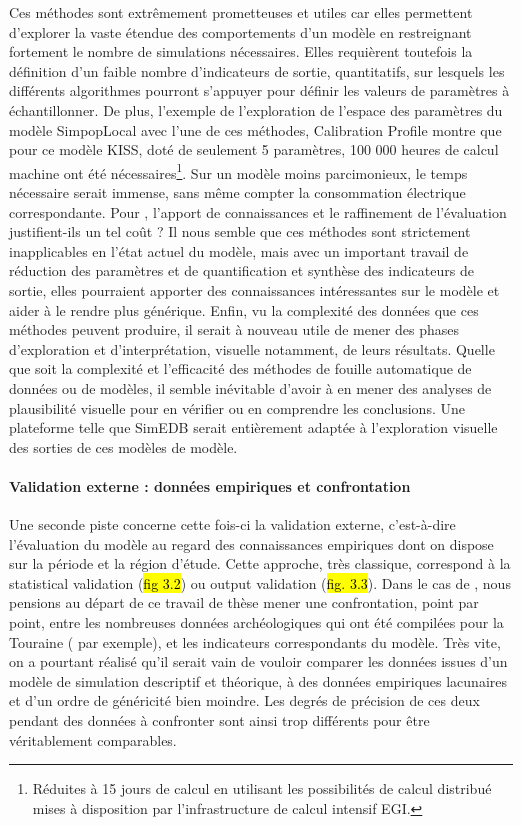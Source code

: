 \noindent Ces méthodes sont extrêmement prometteuses et utiles car elles permettent d'explorer la vaste étendue des comportements d'un modèle en restreignant fortement le nombre de simulations nécessaires.
Elles requièrent toutefois la définition d'un faible nombre d'indicateurs de sortie, quantitatifs, sur lesquels les différents algorithmes pourront s'appuyer pour définir les valeurs de paramètres à échantillonner.
De plus, l'exemple de l'exploration de l'espace des paramètres du modèle SimpopLocal \autocite{schmitt_modelisation_2014} avec l'une de ces méthodes, \og Calibration Profile\fg{} \autocite{reuillon_new_2015} montre que pour ce modèle KISS, doté de seulement 5 paramètres, 100 000 heures de calcul machine ont été nécessaires\footnote{
	Réduites à 15 jours de calcul en utilisant les possibilités de calcul distribué mises à disposition par l'infrastructure de calcul intensif EGI.
}.
Sur un modèle moins parcimonieux, le temps nécessaire serait immense, sans même compter la consommation électrique correspondante.
Pour \simfeodal{}, l'apport de connaissances et le raffinement de l'évaluation justifient-ils un tel coût ?
Il nous semble que ces méthodes sont strictement inapplicables en l'état actuel du modèle, mais avec un important travail de réduction des paramètres et de quantification et synthèse des indicateurs de sortie, elles pourraient apporter des connaissances intéressantes sur le modèle et aider à le rendre plus générique.
Enfin, vu la complexité des données que ces méthodes peuvent produire, il serait à nouveau utile de mener des phases d'exploration et d'interprétation, visuelle notamment, de leurs résultats.
Quelle que soit la complexité et l'efficacité des méthodes de fouille automatique de données ou de modèles, il semble inévitable d'avoir à en mener des analyses de plausibilité visuelle pour en vérifier ou en comprendre les conclusions.
Une plateforme telle que SimEDB serait entièrement adaptée à l'exploration visuelle des sorties de ces modèles de modèle.

\paragraph{Validation externe : données empiriques et confrontation}
Une seconde piste concerne cette fois-ci la validation externe, c'est-à-dire l'évaluation du modèle au regard des connaissances empiriques dont on dispose sur la période et la région d'étude.
Cette approche, très classique, correspond à la \og statistical validation\fg{} (\hl{fig 3.2}) ou \og output validation\fg{} (\hl{fig. 3.3}).
Dans le cas de \simfeodal{}, nous pensions au départ de ce travail de thèse mener une confrontation, point par point, entre les nombreuses données archéologiques qui ont été compilées pour la Touraine (\textcite{rodier_modelisation_2010} par exemple), et les indicateurs correspondants du modèle.
Très vite, on a pourtant réalisé qu'il serait vain de vouloir comparer les données issues d'un modèle de simulation descriptif et théorique, à des données empiriques lacunaires et d'un ordre de généricité bien moindre.
Les degrés de précision de ces deux pendant des données à confronter sont ainsi trop différents pour être véritablement comparables.

